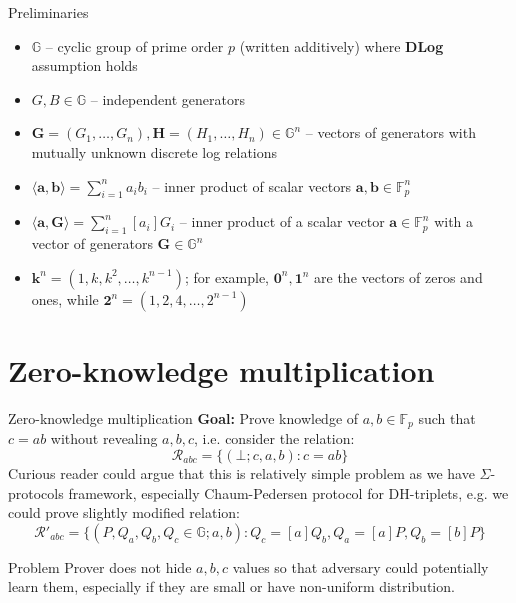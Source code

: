 \documentclass{zkdl-presentation-template}
\begin{document}
    \begin{frame}{Preliminaries}
        \begin{itemize}
            \item $\mathbb{G}$ -- cyclic group of prime order $p$ (written additively) where \textbf{DLog} assumption holds\pause
            \item $G, B \in \mathbb{G}$ -- independent generators
            \item $\mathbf{G} = (G_1,\dots,G_n), \mathbf{H} = (H_1,\dots,H_n) \in \mathbb{G}^n$ -- vectors of generators with mutually unknown discrete log relations\pause
            \item $\langle \mathbf{a}, \mathbf{b} \rangle = \sum_{i=1}^n a_i b_i$ -- inner product of scalar vectors $\mathbf{a}, \mathbf{b} \in \mathbb{F}_p^n$
            \item $\langle \mathbf{a}, \mathbf{G} \rangle = \sum_{i=1}^n [a_i] G_i$ -- inner product of a scalar vector $\mathbf{a} \in \mathbb{F}_p^n$ with a vector of generators $\mathbf{G} \in \mathbb{G}^n$\pause
            \item $\mathbf{k}^n = (1, k, k^2, \dots, k^{n-1})$; for example, $\mathbf{0}^n, \mathbf{1}^n$ are the vectors of zeros and ones, while $\mathbf{2}^n = (1, 2, 4, \dots, 2^{n-1})$
        \end{itemize}
    \end{frame}

    \section{Zero-knowledge multiplication}

    \begin{frame}{Zero-knowledge multiplication}
        \textbf{Goal:} Prove knowledge of $a, b \in \mathbb{F}_p$ such that $c = ab$ without revealing $a, b, c$, i.e. consider the relation:
        $$\mathcal{R}_{abc} = \{ (\bot;c,a,b) : c=ab \}$$
        \pause
        Curious reader could argue that this is relatively simple problem as we have $\Sigma$-protocols framework, especially Chaum-Pedersen protocol for DH-triplets, e.g. we could prove slightly modified relation:
        $$\mathcal{R}'_{abc} = \{ (P, Q_a, Q_b, Q_c \in \mathbb{G};a,b) : Q_c = [a]Q_b, Q_a = [a]P, Q_b = [b]P \}$$
        \pause

        \begin{alertblock}{Problem}
            Prover does not hide $a,b,c$ values so that adversary could potentially learn them, especially if they are small or have non-uniform distribution.
        \end{alertblock}
    \end{frame}
\end{document}
